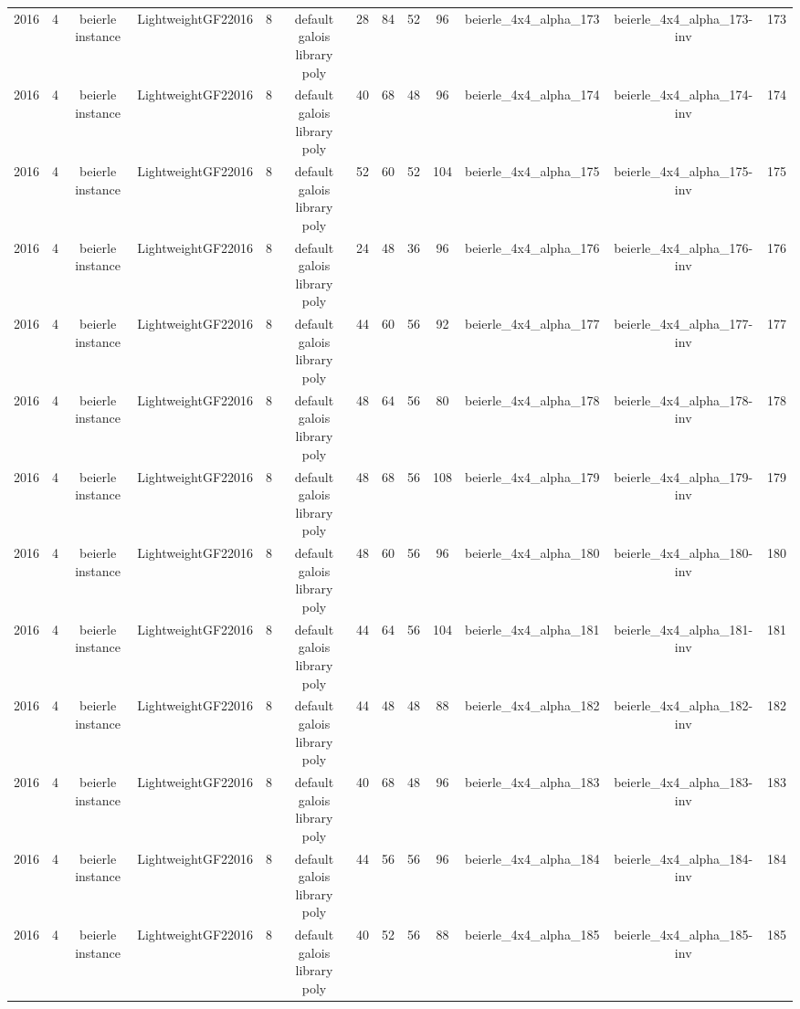 \begin{tabular}{c c c c c c c c c c c c c}
2016 & 4 & beierle instance & LightweightGF22016 & 8 & default galois library poly & 28 & 84 & 52 & 96 & beierle_4x4_alpha_173 & beierle_4x4_alpha_173-inv & 173 \\
2016 & 4 & beierle instance & LightweightGF22016 & 8 & default galois library poly & 40 & 68 & 48 & 96 & beierle_4x4_alpha_174 & beierle_4x4_alpha_174-inv & 174 \\
2016 & 4 & beierle instance & LightweightGF22016 & 8 & default galois library poly & 52 & 60 & 52 & 104 & beierle_4x4_alpha_175 & beierle_4x4_alpha_175-inv & 175 \\
2016 & 4 & beierle instance & LightweightGF22016 & 8 & default galois library poly & 24 & 48 & 36 & 96 & beierle_4x4_alpha_176 & beierle_4x4_alpha_176-inv & 176 \\
2016 & 4 & beierle instance & LightweightGF22016 & 8 & default galois library poly & 44 & 60 & 56 & 92 & beierle_4x4_alpha_177 & beierle_4x4_alpha_177-inv & 177 \\
2016 & 4 & beierle instance & LightweightGF22016 & 8 & default galois library poly & 48 & 64 & 56 & 80 & beierle_4x4_alpha_178 & beierle_4x4_alpha_178-inv & 178 \\
2016 & 4 & beierle instance & LightweightGF22016 & 8 & default galois library poly & 48 & 68 & 56 & 108 & beierle_4x4_alpha_179 & beierle_4x4_alpha_179-inv & 179 \\
2016 & 4 & beierle instance & LightweightGF22016 & 8 & default galois library poly & 48 & 60 & 56 & 96 & beierle_4x4_alpha_180 & beierle_4x4_alpha_180-inv & 180 \\
2016 & 4 & beierle instance & LightweightGF22016 & 8 & default galois library poly & 44 & 64 & 56 & 104 & beierle_4x4_alpha_181 & beierle_4x4_alpha_181-inv & 181 \\
2016 & 4 & beierle instance & LightweightGF22016 & 8 & default galois library poly & 44 & 48 & 48 & 88 & beierle_4x4_alpha_182 & beierle_4x4_alpha_182-inv & 182 \\
2016 & 4 & beierle instance & LightweightGF22016 & 8 & default galois library poly & 40 & 68 & 48 & 96 & beierle_4x4_alpha_183 & beierle_4x4_alpha_183-inv & 183 \\
2016 & 4 & beierle instance & LightweightGF22016 & 8 & default galois library poly & 44 & 56 & 56 & 96 & beierle_4x4_alpha_184 & beierle_4x4_alpha_184-inv & 184 \\
2016 & 4 & beierle instance & LightweightGF22016 & 8 & default galois library poly & 40 & 52 & 56 & 88 & beierle_4x4_alpha_185 & beierle_4x4_alpha_185-inv & 185 \\

\end{tabular}
